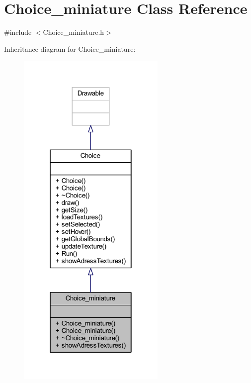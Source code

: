 \hypertarget{class_choice__miniature}{}\section{Choice\+\_\+miniature Class Reference}
\label{class_choice__miniature}


{\ttfamily \#include $<$Choice\+\_\+miniature.\+h$>$}



Inheritance diagram for Choice\+\_\+miniature\+:
\nopagebreak
\begin{figure}[H]
\begin{center}
\leavevmode
\includegraphics[width=202pt]{class_choice__miniature__inherit__graph}
\end{center}
\end{figure}


